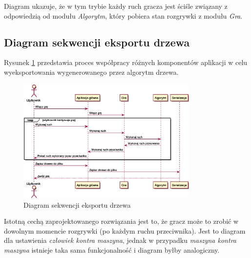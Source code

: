\documentclass{article}
\newcommand{\modulename}[1]{\textit{#1}}
\begin{document}
	\noindent Diagram ukazuje, że w tym trybie każdy ruch gracza jest ściśle związany z odpowiedzią od modułu \modulename{Algorytm}, który pobiera stan rozgrywki z modułu \modulename{Gra}.
	
	\clearpage
	\subsection{Diagram sekwencji eksportu drzewa}
	Rysunek \ref{rys:sequenceserialize} przedstawia proces współpracy różnych komponentów aplikacji w celu wyeksportowania wygenerowanego przez algorytm drzewa.
	\begin{figure}[h]
		\centering
		\includegraphics[width=0.8\textwidth]{serialize_sequence}
		\caption{Diagram sekwencji eksportu drzewa}
		\label{rys:sequenceserialize}
	\end{figure}

	\noindent Istotną cechą zaprojektowanego rozwiązania jest to, że gracz może to zrobić w dowolnym momencie rozgrywki (po każdym ruchu przeciwnika). Jest to diagram dla ustawienia \modulename{człowiek kontra maszyna}, jednak w przypadku \modulename{maszyna kontra maszyna} istnieje taka sama funkcjonalność i diagram byłby analogiczny.
	
	\clearpage
\end{document}
